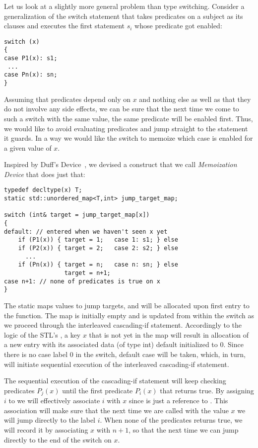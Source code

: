Let us look at a slightly more general problem than type switching. Consider a 
generalization of the switch statement that takes predicates on a subject as its 
clauses and executes the first statement $s_i$ whose predicate got enabled: 

\begin{lstlisting}
switch (x)
{
case P1(x): s1;
 ...
case Pn(x): sn;
}
\end{lstlisting}

\noindent
Assuming that predicates depend only on $x$ and nothing else as well as that 
they do not involve any side effects, we can be sure that the next time we come 
to such a switch with the same value, the same predicate will be enabled 
first. Thus, we would like to avoid evaluating predicates and jump straight to 
the statement it guards. In a way we would like the switch to  memoize which 
case is enabled for a given value of $x$.

Inspired by Duff's Device~\cite{Duff}, we devised a construct that we call 
\emph{Memoization Device} that does just that:

\begin{lstlisting}
typedef decltype(x) T;
static std::unordered_map<T,int> jump_target_map;

switch (int& target = jump_target_map[x])
{
default: // entered when we haven't seen x yet
    if (P1(x)) { target = 1;   case 1: s1; } else 
    if (P2(x)) { target = 2;   case 2: s2; } else
      ...
    if (Pn(x)) { target = n;   case n: sn; } else
                 target = n+1;
case n+1: // none of predicates is true on x
}
\end{lstlisting}

\noindent
The static  maps values to jump targets, and will be 
allocated upon first entry to the function. The map is initially empty and is 
updated from within the switch as we proceed through the interleaved 
cascading-if statement. Accordingly to the logic of the STL's , 
a key $x$ that is not yet in the map will result in allocation of a new entry 
with its associated data (of type int) default initialized to 0. Since there is 
no case label 0 in the switch, default case will be taken, which, in turn, will 
initiate sequential execution of the interleaved cascading-if statement.

The sequential execution of the cascading-if statement will keep checking 
predicates $P_j(x)$ until the first predicate $P_i(x)$ that returns true. By 
assigning $i$ to  we will effectively associate $i$ with $x$ since 
 is just a reference to . This association 
will make sure that the next time we are called with the value $x$ we will jump 
directly to the label $i$. When none of the predicates returns true, we will 
record it by associating $x$ with $n+1$, so that the next time we can jump 
directly to the end of the switch on $x$. 

